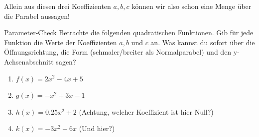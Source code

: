 Allein aus diesen drei Koeffizienten $a, b, c$ können wir also schon eine Menge über die Parabel aussagen!

\begin{aufgabenumgebung}{Parameter-Check}
Betrachte die folgenden quadratischen Funktionen. Gib für jede Funktion die Werte der Koeffizienten $a, b$ und $c$ an. Was kannst du sofort über die Öffnungsrichtung, die Form (schmaler/breiter als Normalparabel) und den y-Achsenabschnitt sagen?
\begin{enumerate}
    \item $f(x) = 2x^2 - 4x + 5$
    \item $g(x) = -x^2 + 3x - 1$
    \item $h(x) = 0.25x^2 + 2$ (Achtung, welcher Koeffizient ist hier Null?)
    \item $k(x) = -3x^2 - 6x$ (Und hier?)
\end{enumerate}
\end{aufgabenumgebung}

